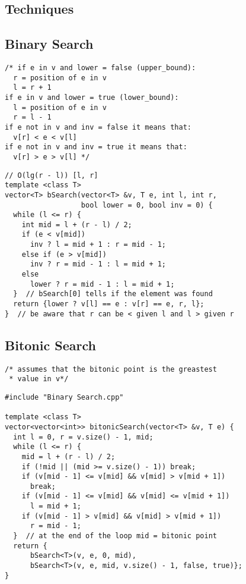 \documentclass[twoside]{article}
\begin{document}
\begin{multicols*}{2}
\section*{Techniques}
\vspace{3em}
\subsectionfont{\large\bfseries\sffamily\underline}
\subsection*{Binary Search}
\begin{verbatim}
/* if e in v and lower = false (upper_bound):
  r = position of e in v
  l = r + 1
if e in v and lower = true (lower_bound):
  l = position of e in v
  r = l - 1
if e not in v and inv = false it means that:
  v[r] < e < v[l]
if e not in v and inv = true it means that:
  v[r] > e > v[l] */
\end{verbatim}
\vspace{-12pt}
\begin{verbatim}
// O(lg(r - l)) [l, r]
template <class T>
vector<T> bSearch(vector<T> &v, T e, int l, int r,
                  bool lower = 0, bool inv = 0) {
  while (l <= r) {
    int mid = l + (r - l) / 2;
    if (e < v[mid])
      inv ? l = mid + 1 : r = mid - 1;
    else if (e > v[mid])
      inv ? r = mid - 1 : l = mid + 1;
    else
      lower ? r = mid - 1 : l = mid + 1;
  }  // bSearch[0] tells if the element was found
  return {lower ? v[l] == e : v[r] == e, r, l};
}  // be aware that r can be < given l and l > given r
\end{verbatim}

\subsectionfont{\large\bfseries\sffamily\underline}
\subsection*{Bitonic Search}
\begin{verbatim}
/* assumes that the bitonic point is the greastest
 * value in v*/

\end{verbatim}
\vspace{-12pt}
\begin{verbatim}
#include "Binary Search.cpp"

template <class T>
vector<vector<int>> bitonicSearch(vector<T> &v, T e) {
  int l = 0, r = v.size() - 1, mid;
  while (l <= r) {
    mid = l + (r - l) / 2;
    if (!mid || (mid >= v.size() - 1)) break;
    if (v[mid - 1] <= v[mid] && v[mid] > v[mid + 1])
      break;
    if (v[mid - 1] <= v[mid] && v[mid] <= v[mid + 1])
      l = mid + 1;
    if (v[mid - 1] > v[mid] && v[mid] > v[mid + 1])
      r = mid - 1;
  }  // at the end of the loop mid = bitonic point
  return {
      bSearch<T>(v, e, 0, mid),
      bSearch<T>(v, e, mid, v.size() - 1, false, true)};
}
\end{verbatim}


\end{multicols*}
\end{document}
